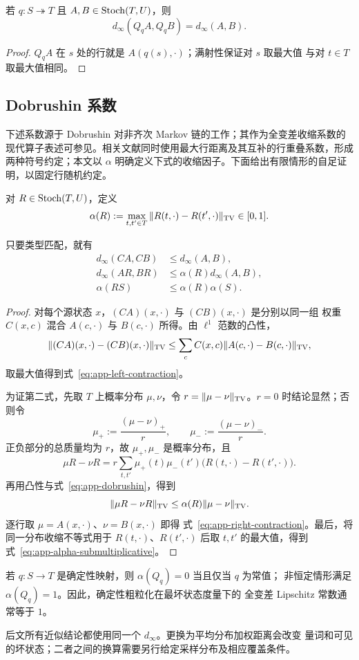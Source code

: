 \begin{lemma}[满射确定性前复合保持行最大值]
\label{lem:app-surjective-pullback}
若 $q:S\twoheadrightarrow T$ 且 $A,B\in\operatorname{Stoch}(T,U)$，则
\[
  d_\infty(Q_qA,Q_qB)=d_\infty(A,B).
\]
\end{lemma}

\begin{proof}
$Q_qA$ 在 $s$ 处的行就是 $A(q(s),\cdot)$；满射性保证对 $s$ 取最大值
与对 $t\in T$ 取最大值相同。
\end{proof}

\subsection{Dobrushin 系数}

下述系数源于 Dobrushin 对非齐次 Markov 链的工作；其作为全变差收缩系数的现代算子表述可参见\citet{Dobrushin1956,GaubertQu2015}。相关文献同时使用最大行距离及其互补的行重叠系数，形成两种符号约定；本文以 $\alpha$ 明确定义下式的收缩因子。下面给出有限情形的自足证明，以固定行随机约定。

对 $R\in\operatorname{Stoch}(T,U)$，定义
\begin{equation}
  \alpha(R):=\max_{t,t'\in T}
  \|R(t,\cdot)-R(t',\cdot)\|_{\operatorname{TV}}\in[0,1].
  \label{eq:app-dobrushin}
\end{equation}

\begin{lemma}
\label{lem:app-tv-contraction}
只要类型匹配，就有
\begin{align}
  d_\infty(CA,CB)&\le d_\infty(A,B),
  \label{eq:app-left-contraction}\\
  d_\infty(AR,BR)&\le \alpha(R)d_\infty(A,B),
  \label{eq:app-right-contraction}\\
  \alpha(RS)&\le\alpha(R)\alpha(S).
  \label{eq:app-alpha-submultiplicative}
\end{align}
\end{lemma}

\begin{proof}
对每个源状态 $x$，$(CA)(x,\cdot)$ 与 $(CB)(x,\cdot)$ 是分别以同一组
权重 $C(x,c)$ 混合 $A(c,\cdot)$ 与 $B(c,\cdot)$ 所得。由 $\ell^1$
范数的凸性，
\[
 \|(CA)(x,\cdot)-(CB)(x,\cdot)\|_{\operatorname{TV}}
 \le \sum_c C(x,c)\|A(c,\cdot)-B(c,\cdot)\|_{\operatorname{TV}},
\]
取最大值得到式~\eqref{eq:app-left-contraction}。

为证第二式，先取 $T$ 上概率分布 $\mu,\nu$，令
$r=\|\mu-\nu\|_{\operatorname{TV}}$。$r=0$ 时结论显然；否则令
\[
  \mu_+:=\frac{(\mu-\nu)_+}{r},
  \qquad
  \mu_-:=\frac{(\mu-\nu)_-}{r}.
\]
正负部分的总质量均为 $r$，故 $\mu_+,\mu_-$ 是概率分布，且
\[
 \mu R-\nu R
 =r\sum_{t,t'}\mu_+(t)\mu_-(t')
   \bigl(R(t,\cdot)-R(t',\cdot)\bigr).
\]
再用凸性与式~\eqref{eq:app-dobrushin}，得到
\[
  \|\mu R-\nu R\|_{\operatorname{TV}}
  \le\alpha(R)\|\mu-\nu\|_{\operatorname{TV}}.
\]
逐行取 $\mu=A(x,\cdot)$、$\nu=B(x,\cdot)$ 即得
式~\eqref{eq:app-right-contraction}。最后，将同一分布收缩不等式用于
$R(t,\cdot)$、$R(t',\cdot)$ 后取 $t,t'$ 的最大值，得到
式~\eqref{eq:app-alpha-submultiplicative}。
\end{proof}

\begin{remark}
若 $q:S\to T$ 是确定性映射，则 $\alpha(Q_q)=0$ 当且仅当 $q$ 为常值；
非恒定情形满足 $\alpha(Q_q)=1$。因此，确定性粗粒化在最坏状态度量下的
全变差 Lipschitz 常数通常等于 $1$。
\end{remark}

后文所有近似结论都使用同一个 $d_\infty$。更换为平均分布加权距离会改变
量词和可见的坏状态；二者之间的换算需要另行给定采样分布及相应覆盖条件。
